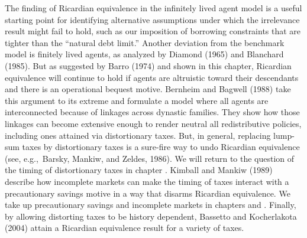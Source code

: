    
 
The finding of Ricardian equivalence in the infinitely lived agent model
is a useful starting point for identifying alternative assumptions under
which the irrelevance result might fail to hold,%
such as our imposition of borrowing constraints that are tighter
than the ``natural debt limit.''
Another deviation from the benchmark model is finitely lived agents,
as analyzed by Diamond (1965) and Blanchard (1985).
But as suggested by Barro (1974)
and shown in this chapter, Ricardian equivalence will
continue to hold if agents are altruistic toward their descendants
and there is an operational bequest motive.
 Bernheim and Bagwell (1988)
take this argument to its extreme and formulate a model where all
agents are interconnected because of linkages across dynastic
families.  They show how those linkages can become extensive enough  to render neutral all redistributive
policies, including ones attained via distortionary taxes. But, in general, replacing
lump-sum taxes by distortionary taxes is a sure-fire way to undo
Ricardian equivalence (see, e.g.,\ Barsky, Mankiw, and Zeldes, 1986).
We will return to the question of the timing of distortionary
taxes in chapter . Kimball and Mankiw (1989) describe
how incomplete markets can make the timing of taxes interact with
a precautionary savings motive in a way that disarms
Ricardian equivalence.    We take up precautionary savings and
incomplete markets in chapters  and
.  Finally, by
allowing distorting taxes to be history dependent, Bassetto and
Kocherlakota (2004) attain a Ricardian equivalence result for a
variety of taxes.   
 
